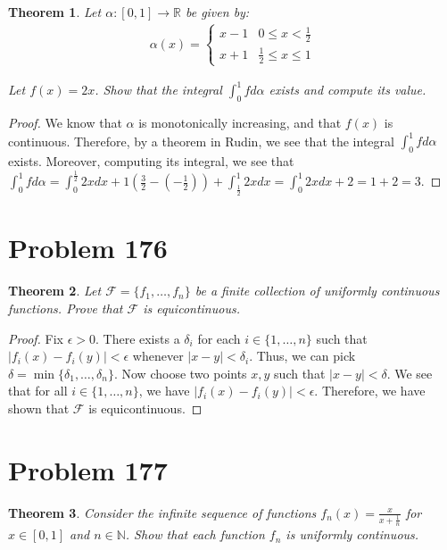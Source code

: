 \documentclass[psamsfonts]{amsart}
\newtheorem{thm}{Theorem}[section]
\theoremstyle{definition}
\theoremstyle{remark}
\numberwithin{equation}{section}
\begin{document}
\begin{thm}
Let $\alpha:[0,1] \to \mathbb{R}$ be given by:
\begin{eqnarray}
\alpha(x) = \left\{ \begin{array}{ll}
x - 1 & 0 \leq x < \frac{1}{2} \\
x+1 & \frac{1}{2} \leq x \leq 1
\end{array} \right.
\end{eqnarray}

Let $f(x) = 2x$. Show that the integral $\int_0^1 f d\alpha$ exists and compute its value.
\end{thm}

\begin{proof}
We know that $\alpha$ is monotonically increasing, and that $f(x)$ is continuous. Therefore, by a theorem in Rudin, we see that the integral $\int_0^1 f d\alpha$ exists. Moreover, computing its integral, we see that $\int_0^1 f d\alpha = \int_0^{\frac{1}{2}} 2x dx + 1( \frac{3}{2} - (-\frac{1}{2})) + \int_{\frac{1}{2}}^1 2x dx = \int_0^1 2x dx + 2 = 1 + 2 = 3$. 
\end{proof}

\section{Problem 176}

\begin{thm}
Let $\mathscr{F} = \{ f_1, \ldots, f_n \}$ be a finite collection of uniformly continuous functions. Prove that $\mathscr{F}$ is equicontinuous. 
\end{thm}

\begin{proof}
Fix $\epsilon > 0$. There exists a $\delta_i$ for each $i \in \{1,\ldots, n\}$ such that $|f_i(x) - f_i(y)| < \epsilon$ whenever $|x-y| < \delta_i$. Thus, we can pick $\delta = \min \{ \delta_1, \ldots, \delta_n \}$. Now choose two points $x,y$ such that $|x-y| < \delta$. We see that for all $i \in \{1,\ldots, n \}$, we have  $|f_i(x) - f_i(y)| < \epsilon$. Therefore, we have shown that $\mathscr{F}$ is equicontinuous.
\end{proof}

\section{Problem 177}

\begin{thm}
Consider the infinite sequence of functions $f_n(x) = \frac{x}{x+ \frac{1}{n}}$ for $x \in [0,1]$ and $n \in \mathbb{N}$. Show that each function $f_n$ is uniformly continuous.
\end{thm}
\end{document}
